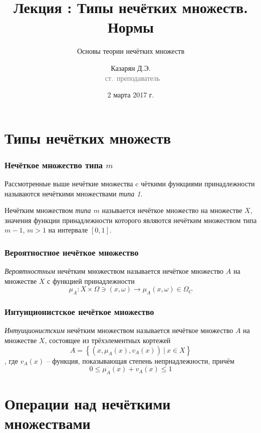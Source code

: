 \documentclass{beamer}
\title{Лекция \textnumero 2: Типы нечётких множеств. Нормы}
\subtitle{Основы теории нечётких множеств}
\author{Казарян Д.Э.\\{\footnotesize\textcolor{gray}{~ст.~преподаватель}}}
\institute{РУДН, Инженерная академия\\Департамент механики и мехатроники}
\date{2 марта 2017 г.}
\begin{document}
\lstset{language=python}

\frame{\titlepage}

\section{Типы нечётких множеств}

\begin{frame}\frametitle{Нечёткое множество типа $m$}

    Рассмотренные выше нечёткие множества c чёткими функциями принадлежности называются нечёткими множествами \textit{типа 1}.
    
    \begin{definition}
        Нечётким множеством \textit{типа $m$} называется нечёткое множество на множестве $X$, значения функции принадлежности которого являются нечётким множеством типа $m-1$, $m > 1$ на интервале $[0, 1]$.
    \end{definition}
    
\end{frame}

\begin{frame}\frametitle{Вероятностное нечёткое множество}

    \begin{definition}
        \textit{Вероятностным} нечётким множеством называется нечёткое множество $A$ на множестве $X$ с функцией принадлежности
        \[
            \mu_A : X \times \Omega \ni (x, \omega) \to \mu_A(x, \omega) \in \Omega_C
        \]
    \end{definition}
    
\end{frame}

\begin{frame}\frametitle{Интуиционистское нечёткое множество}

    \begin{definition}
        \textit{Интуиционистским} нечётким множеством называется нечёткое множество $A$ на множестве $X$, состоящее из трёхэлементных кортежей
        \[
            A = \left\{ \left(x, \mu_A(x), v_A(x)\right)\ |\ x \in X \right\}
        \],
        где $v_A(x)$ -- функция, показывающая степень непрнадлежности, причём
        \[
            0 \leq \mu_A(x) + v_A(x) \leq 1
        \]
    \end{definition}
    
\end{frame}

\section{Операции над нечёткими множествами}
\end{document}
